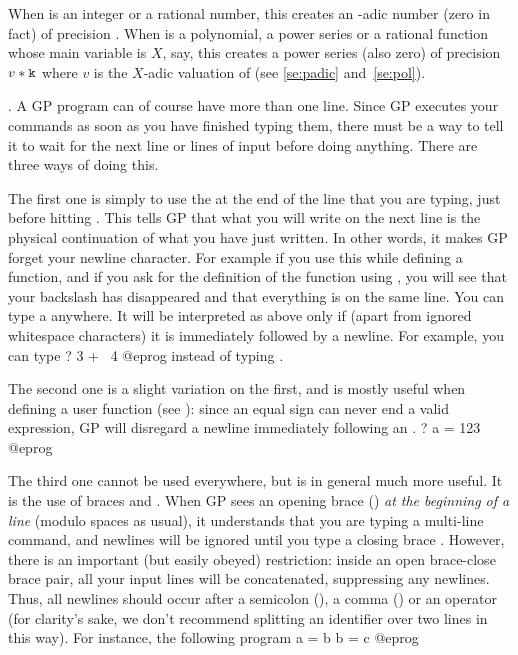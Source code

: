 \noindent
When  is an integer or a rational number, this creates an
-adic number (zero in fact) of precision . When 
is a polynomial, a power series or a rational function whose main variable is
$X$, say, this creates a power series (also zero) of precision $v*{\tt k}$
where $v$ is the $X$-adic valuation of  (see \ref{se:padic}
and~\ref{se:pol}).

. A GP program
can of course have more than one line. Since GP executes your commands as
soon as you have finished typing them, there must be a way to tell it to
wait for the next line or lines of input before doing anything. There are
three ways of doing this.

The first one is simply to use the  \kbd{\bs} at the
end of the line that you are typing, just before hitting . This
tells GP that what you will write on the next line is the physical
continuation of what you have just written. In other words, it makes GP
forget your newline character. For example if you use this while defining a
function, and if you ask for the definition of the function using
, you will see that your backslash has disappeared and that
everything is on the same line. You can type a \kbd{\bs} anywhere. It will be
interpreted as above only if (apart from ignored whitespace characters) it is
immediately followed by a newline. For example, you can type
\bprog
? 3 + \
4
@eprog
\noindent instead of typing .

The second one is a slight variation on the first, and is mostly useful when
defining a user function (see \secref{se:user_defined}): since an equal sign
can never end a valid expression, GP will disregard a newline immediately
following an \kbd{=}.
\bprog
? a =
123
@eprog

The third one cannot be used everywhere, but is in general much more useful.
It is the use of braces \kbd{\obr} and  \kbd{\cbr}.\sidx{brace characters}
When GP sees an opening brace (\kbd{\obr}) \emph{at the beginning of a line}
(modulo spaces as usual), it understands that you are typing a multi-line
command, and newlines will be ignored until you type a closing brace
\kbd{\cbr}. However, there is an important (but easily obeyed) restriction:
inside an open brace-close brace pair, all your input lines will be
concatenated, suppressing any newlines. Thus, all newlines should occur after
a semicolon (\kbd{;}), a comma (\kbd{,}) or an operator (for clarity's sake,
we don't recommend splitting an identifier over two lines in this way). For
instance, the following program
\bprog
{
  a = b
  b = c
}
@eprog

